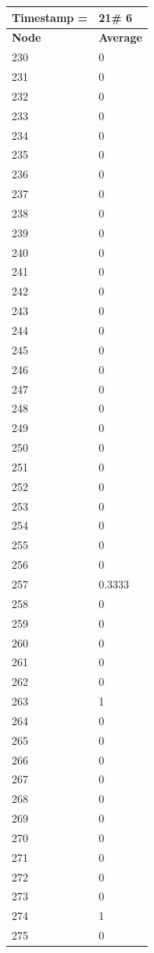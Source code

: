 \begin{tabular}{|l||l|}
\hline
\textbf{Timestamp =} & \textbf{21}\# 6\\\hline
	\textbf{Node} & \textbf{Average} \\ \hline
\hline
	230 & 0 \\ \hline
	231 & 0 \\ \hline
	232 & 0 \\ \hline
	233 & 0 \\ \hline
	234 & 0 \\ \hline
	235 & 0 \\ \hline
	236 & 0 \\ \hline
	237 & 0 \\ \hline
	238 & 0 \\ \hline
	239 & 0 \\ \hline
	240 & 0 \\ \hline
	241 & 0 \\ \hline
	242 & 0 \\ \hline
	243 & 0 \\ \hline
	244 & 0 \\ \hline
	245 & 0 \\ \hline
	246 & 0 \\ \hline
	247 & 0 \\ \hline
	248 & 0 \\ \hline
	249 & 0 \\ \hline
	250 & 0 \\ \hline
	251 & 0 \\ \hline
	252 & 0 \\ \hline
	253 & 0 \\ \hline
	254 & 0 \\ \hline
	255 & 0 \\ \hline
	256 & 0 \\ \hline
	257 & 0.3333 \\ \hline
	258 & 0 \\ \hline
	259 & 0 \\ \hline
	260 & 0 \\ \hline
	261 & 0 \\ \hline
	262 & 0 \\ \hline
	263 & 1 \\ \hline
	264 & 0 \\ \hline
	265 & 0 \\ \hline
	266 & 0 \\ \hline
	267 & 0 \\ \hline
	268 & 0 \\ \hline
	269 & 0 \\ \hline
	270 & 0 \\ \hline
	271 & 0 \\ \hline
	272 & 0 \\ \hline
	273 & 0 \\ \hline
	274 & 1 \\ \hline
	275 & 0 \\ \hline
\end{tabular}

